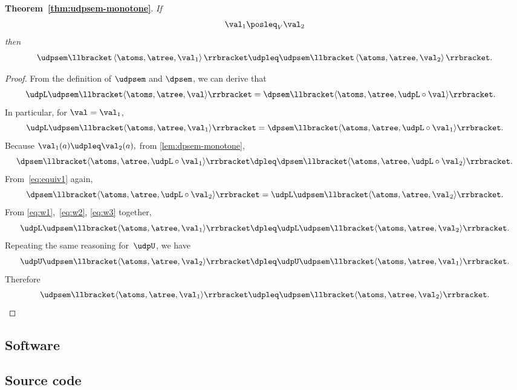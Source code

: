 \textbf{Theorem~\ref{thm:udpsem-monotone}}. \emph{If
\[
\val_{1}\posleq_{V}\val_{2}
\]
then
\[
\udpsem\llbracket\left\langle \atoms,\atree,\val_{1}\right\rangle \rrbracket\udpleq\udpsem\llbracket\left\langle \atoms,\atree,\val_{2}\right\rangle \rrbracket.
\]
}
\begin{proof}
From the definition of $\udpsem$ and $\dpsem$, we can derive that
\begin{align}
\udpL\udpsem\llbracket\langle\atoms,\atree,\val\rangle\rrbracket & =\dpsem\llbracket\langle\atoms,\atree,\udpL\circ\val\rangle\rrbracket.\label{eq:equiv1}
\end{align}
In particular, for $\val=\val_{1}$,
\begin{equation}
\udpL\udpsem\llbracket\langle\atoms,\atree,\val_{1}\rangle\rrbracket=\dpsem\llbracket\langle\atoms,\atree,\udpL\circ\val_{1}\rangle\rrbracket.\label{eq:w1}
\end{equation}
Because $\val_{1}(a)\udpleq\val_{2}(a),$ from \cref{lem:dpsem-monotone},
\begin{equation}
\dpsem\llbracket\langle\atoms,\atree,\udpL\circ\val_{1}\rangle\rrbracket\dpleq\dpsem\llbracket\langle\atoms,\atree,\udpL\circ\val_{2}\rangle\rrbracket.\label{eq:w2}
\end{equation}
From~\cref{eq:equiv1} again,
\begin{equation}
\dpsem\llbracket\langle\atoms,\atree,\udpL\circ\val_{2}\rangle\rrbracket=\udpL\udpsem\llbracket\langle\atoms,\atree,\val_{2}\rangle\rrbracket.\label{eq:w3}
\end{equation}
From \eqref{eq:w1},~\eqref{eq:w2}, \eqref{eq:w3} together,
\[
\udpL\udpsem\llbracket\langle\atoms,\atree,\val_{1}\rangle\rrbracket\dpleq\udpL\udpsem\llbracket\langle\atoms,\atree,\val_{2}\rangle\rrbracket.
\]
 Repeating the same reasoning for~$\udpU$, we have
\[
\udpU\udpsem\llbracket\langle\atoms,\atree,\val_{2}\rangle\rrbracket\dpleq\udpU\udpsem\llbracket\langle\atoms,\atree,\val_{1}\rangle\rrbracket.
\]
 Therefore
\[
\udpsem\llbracket\langle\atoms,\atree,\val_{1}\rangle\rrbracket\udpleq\udpsem\llbracket\langle\atoms,\atree,\val_{2}\rangle\rrbracket.
\]
\end{proof}

\vfill\pagebreak

\subsection{Software}

\subsection{Source code}

